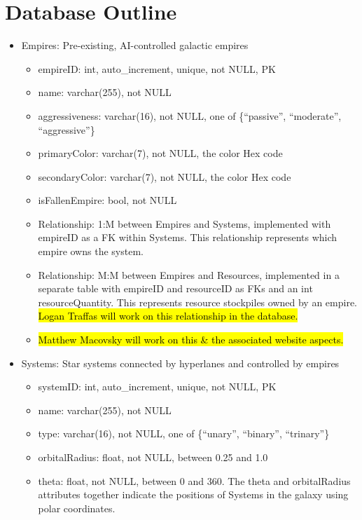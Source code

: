 \documentclass[12pt]{article}
\begin{document}
\newpage
\section{Database Outline}

\begin{itemize}
    \item Empires: Pre-existing, AI-controlled galactic empires
    \begin{itemize}
        \item empireID: int, auto\_increment, unique, not NULL, PK
        \item name: varchar(255), not NULL
        \item aggressiveness: varchar(16), not NULL, one of \{“passive”, “moderate”, “aggressive”\}
        \item primaryColor: varchar(7), not NULL, the color Hex code
        \item secondaryColor: varchar(7), not NULL, the color Hex code
        \item isFallenEmpire: bool, not NULL
        \item Relationship: 1:M between Empires and Systems, implemented with empireID as a FK within Systems. This relationship represents which empire owns the system.
        \item Relationship: M:M between Empires and Resources, implemented in a separate table with empireID and resourceID as FKs and an int resourceQuantity. This represents resource stockpiles owned by an empire. \hl{Logan Traffas will work  on this relationship in the database.}
        \item \hl{Matthew Macovsky will work on this \& the associated website aspects.}
    \end{itemize}
    \item Systems: Star systems connected by hyperlanes and controlled by empires
    \begin{itemize}
        \item systemID: int, auto\_increment, unique, not NULL, PK
        \item name: varchar(255), not NULL
        \item type: varchar(16), not NULL, one of \{“unary”, “binary”, “trinary”\}
        \item orbitalRadius: float, not NULL, between 0.25 and 1.0
        \item theta: float, not NULL, between 0 and 360. The theta and orbitalRadius attributes together indicate the positions of Systems in the galaxy using polar coordinates.

\end{itemize}
\end{itemize}
\end{document}

